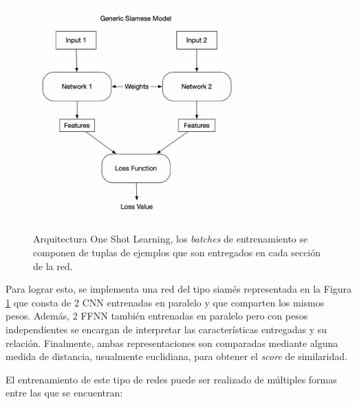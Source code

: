 \begin{figure}[h]
    \centering
    \includegraphics[width=8cm]{img/tesis/siamese.png}
    \caption{Arquitectura One Shot Learning, los \textit{batches} de entrenamiento se componen de tuplas de ejemplos que son entregados en cada sección de la red.}
    \label{fig:oneshot}
\end{figure}


Para lograr esto, se implementa una red del tipo siamés representada en la Figura \ref{fig:oneshot} que consta de 2 CNN entrenadas en paralelo y que comparten los mismos pesos. Además, 2 FFNN también entrenadas en paralelo pero con pesos independientes se encargan de interpretar las características entregadas y su relación. Finalmente, ambas representaciones son comparadas mediante alguna medida de distancia, usualmente euclidiana, para obtener el \textit{score} de similaridad. 

\vspace{0.2cm}

El entrenamiento de este tipo de redes puede ser realizado de múltiples formas entre las que se encuentran: 

